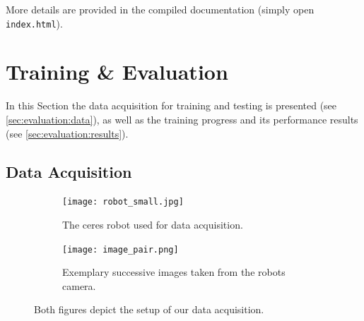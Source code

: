\documentclass[a4paper,11pt]{article}
\begin{document}
More details are provided in the compiled documentation (simply open
\texttt{index.html}).

\section{Training \& Evaluation}
\label{sec:evaluation}
In this Section the data acquisition for training and testing is presented (see
\autoref{sec:evaluation:data}), as well as the training progress and its
performance results (see \autoref{sec:evaluation:results}).


\subsection{Data Acquisition}
\label{sec:evaluation:data}
\begin{figure}[htb]
    \centering
    \begin{subfigure}[t]{0.6\linewidth}
            \centering
            \texttt{[image: robot\_small.jpg]}
            \caption[]{The ceres robot used for data acquisition.}
            \label{fig:robot}
    \end{subfigure}
    \begin{subfigure}[t]{0.39\linewidth}
            \centering
            \texttt{[image: image\_pair.png]}
            \caption[]{Exemplary successive images taken from the robots camera.}
            \label{fig:camera_images}
    \end{subfigure}
    \caption[]{Both figures depict the setup of our data acquisition.}
    \label{fig:setup}
\end{figure}

%
%

\end{document}

